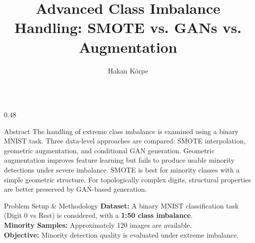 \documentclass[final]{beamer}
\title{Advanced Class Imbalance Handling: SMOTE vs. GANs vs. Augmentation}
\author{Hakan Körpe}
\institute{TU Dortmund -- AIML Course}
\begin{document}
\begin{frame}[t]{}

\vspace*{-1.0cm}



\vspace*{3.5cm}

\begin{columns}[t,totalwidth=\textwidth]

\begin{column}{0.48\textwidth}

\begin{block}{Abstract}
The handling of extreme class imbalance is examined using a binary MNIST task. Three data-level approaches are compared: SMOTE interpolation, geometric augmentation, and conditional GAN generation. Geometric augmentation improves feature learning but fails to produce usable minority detections under severe imbalance. SMOTE is best for minority classes with a simple geometric structure. For topologically complex digits, structural properties are better preserved by GAN-based generation.
\end{block}

\begin{block}{Problem Setup \& Methodology}
\textbf{Dataset:} A binary MNIST classification task (Digit 0 vs Rest) is considered, with a \textbf{1:50 class imbalance}.\\
\textbf{Minority Samples:} Approximately 120 images are available.\\
\textbf{Objective:} Minority detection quality is evaluated under extreme imbalance.


\end{block}
\end{column}
\end{columns}
\end{frame}
\end{document}
